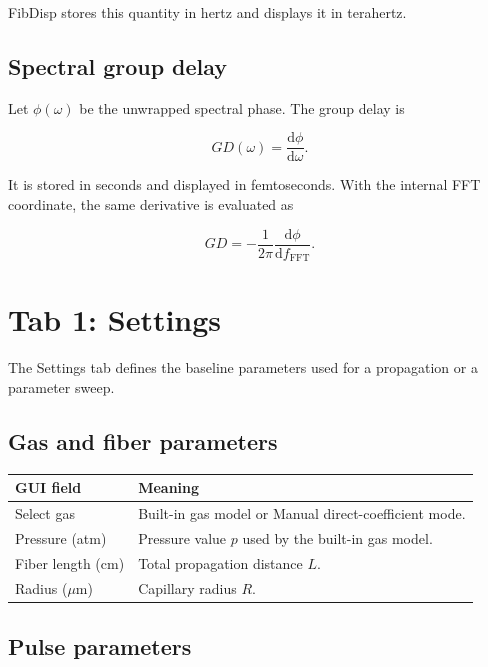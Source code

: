 \documentclass[11pt,a4paper]{article}
\newcommand{\FFT}{\mathrm{FFT}}
\newcommand{\dd}{\mathrm{d}}
\begin{document}
FibDisp stores this quantity in hertz and displays it in terahertz.

\subsection{Spectral group delay}

Let $\phi(\omega)$ be the unwrapped spectral phase. The group delay is

\begin{equation}
\boxed{
GD(\omega)=\frac{\dd\phi}{\dd\omega}.
}
\end{equation}

It is stored in seconds and displayed in femtoseconds. With the internal FFT
coordinate, the same derivative is evaluated as

\begin{equation}
GD
=-\frac{1}{2\pi}
\frac{\dd\phi}{\dd f_{\FFT}}.
\end{equation}

\section{Tab 1: Settings}

The Settings tab defines the baseline parameters used for a propagation or a
parameter sweep.

\subsection{Gas and fiber parameters}

\begin{longtable}{p{}p{}}
\toprule
\textbf{GUI field} & \textbf{Meaning}\\
\midrule
Select gas & Built-in gas model or Manual direct-coefficient mode.\\
Pressure (atm) & Pressure value $p$ used by the built-in gas model.\\
Fiber length (cm) & Total propagation distance $L$.\\
Radius ($\mu$m) & Capillary radius $R$.\\
\bottomrule
\end{longtable}

\subsection{Pulse parameters}
\end{document}
